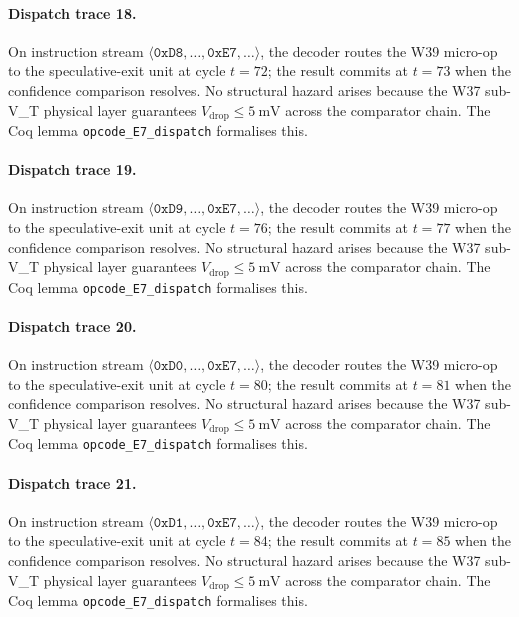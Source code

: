 \paragraph{Dispatch trace 18.}
On instruction stream $\langle \mathtt{0xD8}, \dots, \mathtt{0xE7}, \dots \rangle$,
the decoder routes the W39 micro-op to the speculative-exit unit at cycle
$t = 72$; the result commits at $t = 73$ when the confidence
comparison resolves. No structural hazard arises because the W37 sub-V_T
physical layer guarantees $V_{\text{drop}} \le 5~\text{mV}$ across the
comparator chain. The Coq lemma {\tt opcode\_E7\_dispatch} formalises this.

\paragraph{Dispatch trace 19.}
On instruction stream $\langle \mathtt{0xD9}, \dots, \mathtt{0xE7}, \dots \rangle$,
the decoder routes the W39 micro-op to the speculative-exit unit at cycle
$t = 76$; the result commits at $t = 77$ when the confidence
comparison resolves. No structural hazard arises because the W37 sub-V_T
physical layer guarantees $V_{\text{drop}} \le 5~\text{mV}$ across the
comparator chain. The Coq lemma {\tt opcode\_E7\_dispatch} formalises this.

\paragraph{Dispatch trace 20.}
On instruction stream $\langle \mathtt{0xD0}, \dots, \mathtt{0xE7}, \dots \rangle$,
the decoder routes the W39 micro-op to the speculative-exit unit at cycle
$t = 80$; the result commits at $t = 81$ when the confidence
comparison resolves. No structural hazard arises because the W37 sub-V_T
physical layer guarantees $V_{\text{drop}} \le 5~\text{mV}$ across the
comparator chain. The Coq lemma {\tt opcode\_E7\_dispatch} formalises this.

\paragraph{Dispatch trace 21.}
On instruction stream $\langle \mathtt{0xD1}, \dots, \mathtt{0xE7}, \dots \rangle$,
the decoder routes the W39 micro-op to the speculative-exit unit at cycle
$t = 84$; the result commits at $t = 85$ when the confidence
comparison resolves. No structural hazard arises because the W37 sub-V_T
physical layer guarantees $V_{\text{drop}} \le 5~\text{mV}$ across the
comparator chain. The Coq lemma {\tt opcode\_E7\_dispatch} formalises this.

